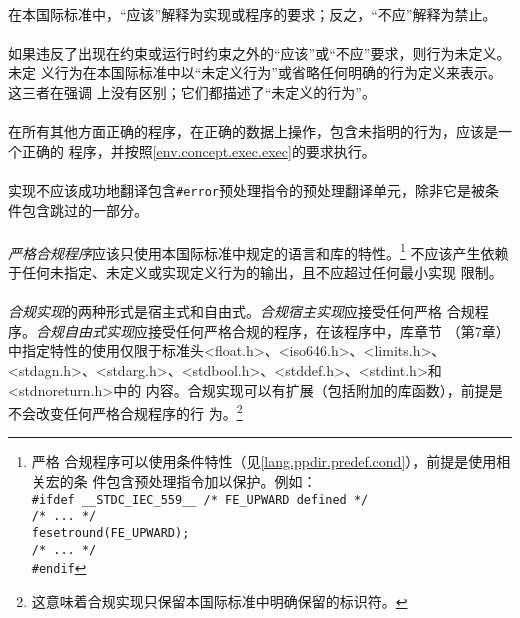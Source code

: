 
\paragraph{}
在本国际标准中，``应该''解释为实现或程序的要求；反之，``不应''解释为禁止。

\paragraph{}
如果违反了出现在约束或运行时约束之外的``应该''或``不应''要求，则行为未定义。未定
义行为在本国际标准中以``未定义行为''或省略任何明确的行为定义来表示。这三者在强调
上没有区别；它们都描述了``未定义的行为''。

\paragraph{}
在所有其他方面正确的程序，在正确的数据上操作，包含未指明的行为，应该是一个正确的
程序，并按照\ref{env.concept.exec.exec}的要求执行。

\paragraph{}
实现不应该成功地翻译包含\texttt{\#error}预处理指令的预处理翻译单元，除非它是被条
件包含跳过的一部分。

\paragraph{}
\textit{严格合规程序}应该只使用本国际标准中规定的语言和库的特性。\footnote{严格
合规程序可以使用条件特性（见\ref{lang.ppdir.predef.cond}），前提是使用相关宏的条
件包含预处理指令加以保护。例如：                                              \\
\mbox{\qquad\texttt{\#ifdef \_\_STDC\_IEC\_559\_\_ /* FE\_UPWARD defined */}} \\
\mbox{\qquad\qquad\texttt{/* ... */}}                                         \\
\mbox{\qquad\qquad\texttt{fesetround(FE\_UPWARD);}}                           \\
\mbox{\qquad\qquad\texttt{/* ... */}}                                         \\
\mbox{\qquad\texttt{\#endif}}
} 不应该产生依赖于任何未指定、未定义或实现定义行为的输出，且不应超过任何最小实现
限制。

\paragraph{}
\textit{合规实现}的两种形式是宿主式和自由式。\textit{合规宿主实现}应接受任何严格
合规程序。\textit{合规自由式实现}应接受任何严格合规的程序，在该程序中，库章节
（第7章）中指定特性的使用仅限于标准头<float.h>、<iso646.h>、<limits.h>、
<stdagn.h>、<stdarg.h>、<stdbool.h>、<stddef.h>、<stdint.h>和<stdnoreturn.h>中的
内容。合规实现可以有扩展（包括附加的库函数），前提是不会改变任何严格合规程序的行
为。\footnote{这意味着合规实现只保留本国际标准中明确保留的标识符。}

